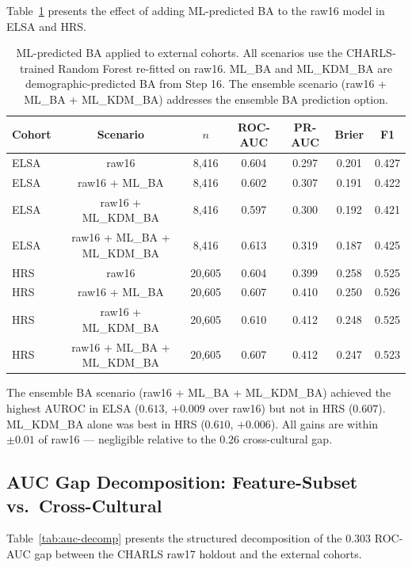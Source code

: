 \documentclass[11pt,a4paper]{article}
\begin{document}
Table~\ref{tab:ml-ba-external} presents the effect of adding ML-predicted BA to the
raw16 model in ELSA and HRS.

\begin{table}[h!]
\centering
\small
\caption{ML-predicted BA applied to external cohorts. All scenarios use the CHARLS-trained
Random Forest re-fitted on raw16. ML\_BA and ML\_KDM\_BA are demographic-predicted BA from
Step 16. The ensemble scenario (raw16 + ML\_BA + ML\_KDM\_BA) addresses the ensemble BA
prediction option.}
\label{tab:ml-ba-external}
\begin{tabular}{lcccccc}
\toprule
Cohort & Scenario & $n$ & ROC-AUC & PR-AUC & Brier & F1 \\
\midrule
ELSA & raw16               & 8{,}416  & 0.604 & 0.297 & 0.201 & 0.427 \\
ELSA & raw16 + ML\_BA       & 8{,}416  & 0.602 & 0.307 & 0.191 & 0.422 \\
ELSA & raw16 + ML\_KDM\_BA  & 8{,}416  & 0.597 & 0.300 & 0.192 & 0.421 \\
ELSA & raw16 + ML\_BA + ML\_KDM\_BA & 8{,}416 & 0.613 & 0.319 & 0.187 & 0.425 \\
\midrule
HRS  & raw16               & 20{,}605 & 0.604 & 0.399 & 0.258 & 0.525 \\
HRS  & raw16 + ML\_BA       & 20{,}605 & 0.607 & 0.410 & 0.250 & 0.526 \\
HRS  & raw16 + ML\_KDM\_BA  & 20{,}605 & 0.610 & 0.412 & 0.248 & 0.525 \\
HRS  & raw16 + ML\_BA + ML\_KDM\_BA & 20{,}605 & 0.607 & 0.412 & 0.247 & 0.523 \\
\bottomrule
\end{tabular}
\end{table}

The ensemble BA scenario (raw16 + ML\_BA + ML\_KDM\_BA) achieved the highest AUROC in
ELSA ($0.613$, $+0.009$ over raw16) but not in HRS ($0.607$). ML\_KDM\_BA alone was
best in HRS ($0.610$, $+0.006$). All gains are within $\pm 0.01$ of raw16 ---
negligible relative to the $0.26$ cross-cultural gap.

\subsection{AUC Gap Decomposition: Feature-Subset vs.\ Cross-Cultural}

Table~\ref{tab:auc-decomp} presents the structured decomposition of the
$0.303$ ROC-AUC gap between the CHARLS raw17 holdout and the external cohorts.
\end{document}
